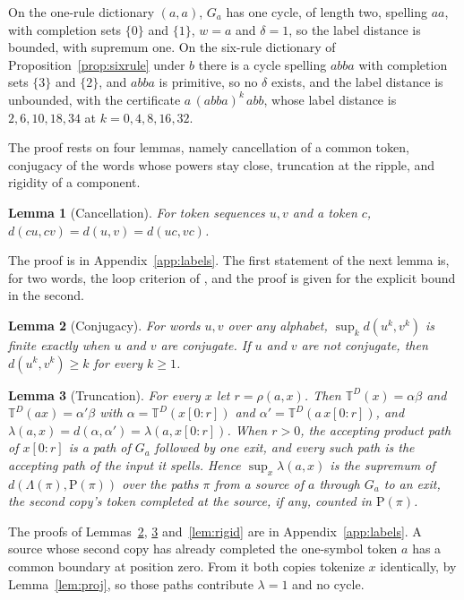 \documentclass[11pt,a4paper]{article}
\theoremstyle{definition}
\theoremstyle{plain}
\newtheorem{lemma}{Lemma}
\newcommand{\T}{\mathbb{T}}
\begin{document}
On the one-rule dictionary \((a, a)\), \(G_a\) has one cycle, of length two, spelling \(aa\), with completion sets
\(\{0\}\) and \(\{1\}\), \(w = a\) and \(\delta = 1\), so the label distance is bounded, with supremum one. On the
six-rule dictionary of Proposition~\ref{prop:sixrule} under \(b\) there is a cycle spelling \(abba\) with completion
sets \(\{3\}\) and \(\{2\}\), and \(abba\) is primitive, so no \(\delta\) exists, and the label distance is unbounded,
with the certificate \(a\,(abba)^k\,abb\), whose label distance is \(2, 6, 10, 18, 34\) at \(k = 0, 4, 8, 16, 32\).

The proof rests on four lemmas, namely cancellation of a common token, conjugacy of the words whose powers stay close,
truncation at the ripple, and rigidity of a component.

\begin{lemma}[Cancellation]\label{lem:cancel}
For token sequences \(u, v\) and a token \(c\), \(d(cu, cv) = d(u, v) = d(uc, vc)\).
\end{lemma}

The proof is in Appendix~\ref{app:labels}. The first statement of the next lemma is, for two words, the loop criterion
of \citet[Lemma~4.1 and Claim~4.9]{aiswarya2024edit}, and the proof is given for the explicit bound in the second.

\begin{lemma}[Conjugacy]\label{lem:conjugacy}
For words \(u, v\) over any alphabet, \(\sup_k d(u^k, v^k)\) is finite exactly when \(u\) and \(v\) are conjugate. If
\(u\) and \(v\) are not conjugate, then \(d(u^k, v^k) \ge k\) for every \(k \ge 1\).
\end{lemma}

\begin{lemma}[Truncation]\label{lem:truncate}
For every \(x\) let \(r = \rho(a, x)\). Then \(\T^D(x) = \alpha\beta\) and \(\T^D(ax) = \alpha'\beta\) with
\(\alpha = \T^D(x[0{:}r])\) and \(\alpha' = \T^D(a\,x[0{:}r])\), and
\(\lambda(a, x) = d(\alpha, \alpha') = \lambda(a, x[0{:}r])\). When \(r > 0\), the accepting product path of
\(x[0{:}r]\) is a path of \(G_a\) followed by one exit, and every such path is the accepting path of the input it
spells. Hence \(\sup_x \lambda(a, x)\) is the supremum of \(d(\Lambda(\pi), \mathrm{P}(\pi))\) over the paths \(\pi\)
from a source of \(a\) through \(G_a\) to an exit, the second copy's token completed at the source, if any, counted in
\(\mathrm{P}(\pi)\).
\end{lemma}

The proofs of Lemmas~\ref{lem:conjugacy}, \ref{lem:truncate} and~\ref{lem:rigid} are in Appendix~\ref{app:labels}. A
source whose second copy has already completed the one-symbol token \(a\) has a common boundary at position zero. From
it both copies tokenize \(x\) identically, by Lemma~\ref{lem:proj}, so those paths contribute \(\lambda = 1\) and no
cycle.
\end{document}
